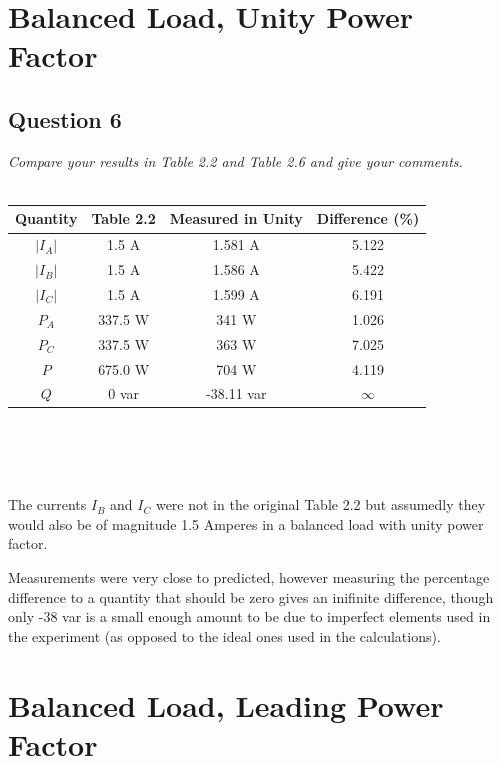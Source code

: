 \documentclass{article}
\begin{document}
  \clearpage

\section{Balanced Load, Unity Power Factor}
  \subsection{Question 6}
  \textit{Compare your results in Table 2.2 and Table 2.6 and give your comments.} \\ \\
  \begin{centering}
  \begin{tabular}{|c|c|c|c|} \hline
    Quantity    & Table 2.2 & Measured in Unity  & Difference (\%)  \\ \hline
    $|I_{A}|$   & 1.5 A     & 1.581 A     &  5.122    \\ \hline
    $|I_{B}|$   & 1.5 A     & 1.586 A     &  5.422    \\ \hline
    $|I_{C}|$   & 1.5 A     & 1.599 A     &  6.191    \\ \hline
    $P_{A}$     & 337.5 W   & 341 W       &  1.026    \\ \hline
    $P_{C}$     & 337.5 W   & 363 W       &  7.025    \\ \hline
    $P$         & 675.0 W   & 704 W       &  4.119    \\ \hline
    $Q$         & 0 var     & -38.11 var  & $\infty$  \\ \hline
  \end{tabular} \\ 
  \end{centering} 
  \noindent \\ \\
  The currents $I_{B}$ and $I_{C}$ were not in the original Table 2.2 but assumedly they would also be of magnitude 1.5 Amperes in a balanced load with unity power factor. \par
  Measurements were very close to predicted, however measuring the percentage difference to a quantity that should be zero gives an inifinite difference, though only -38 var is a small enough amount to be due to imperfect elements used in the experiment (as opposed to the ideal ones used in the calculations).
  
  \clearpage


\section{Balanced Load, Leading Power Factor}
\end{document}
